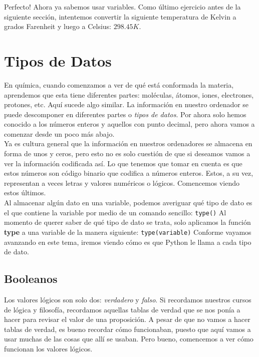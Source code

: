 \documentclass[10pt,letterpaper]{article}
\newcommand{\inlinecode}[1]{
\colorbox{light-gray}{\texttt{#1}}
}
\begin{document}
Perfecto! Ahora ya sabemos usar variables. Como \'ultimo ejercicio antes de la siguiente secci\'on, intentemos convertir la siguiente temperatura de Kelvin a grados Farenheit y luego a Celsius: $298.45 K$.

\section{Tipos de Datos}
En qu\'imica, cuando comenzamos a ver de qu\'e est\'a conformada la materia, aprendemos que esta tiene diferentes partes: mol\'eculas, \'atomos, iones, electrones, protones, etc. Aqu\'i sucede algo similar. La informaci\'on en nuestro ordenador se puede descomponer en diferentes partes o \emph{tipos de datos}. Por ahora solo hemos conocido a los n\'umeros enteros y aquellos con punto decimal, pero ahora vamos a comenzar desde un poco m\'as abajo.\\

Ya es cultura general que la informaci\'on en nuestros ordenadores se almacena en forma de unos y ceros, pero esto no es solo cuesti\'on de que si deseamos vamos a ver la informaci\'on codificada as\'i. Lo que tenemos que tomar en cuenta es que estos n\'umeros son c\'odigo binario que codifica a n\'umeros enteros. Estos, a su vez, representan a veces letras y valores num\'ericos o l\'ogicos. Comencemos viendo estos \'ultimos.\\

Al almacenar alg\'un dato en una variable, podemos averiguar qu\'e tipo de dato es el que contiene la variable por medio de un comando sencillo: \inlinecode{type()} Al momento de querer saber de qu\'e tipo de dato se trata, solo aplicamos la funci\'on \textbf{type} a una variable de la manera siguiente: \inlinecode{type(variable)} Conforme vayamos avanzando en este tema, iremos viendo c\'omo es que Python le llama a cada tipo de dato.

\subsection{Booleanos}
Los valores l\'ogicos son solo dos: \emph{verdadero} y \emph{falso}. Si recordamos nuestros cursos de l\'ogica y filosof\'ia, recordamos aquellas tablas de verdad que se nos pon\'ia a hacer para revisar el valor de una proposici\'on. A pesar de que no vamos a hacer tablas de verdad, es bueno recordar c\'omo funcionaban, puesto que aqu\'i vamos a usar muchas de las cosas que all\'i se usaban. Pero bueno, comencemos a ver c\'omo funcionan los valores l\'ogicos.\\
\end{document}
